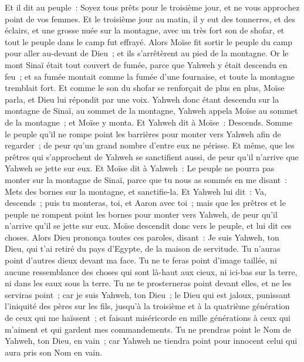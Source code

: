 \begin{multicols}{2}
Et il dit au peuple~: Soyez tous prêts pour le troisième jour, et ne vous approchez point de vos femmes.
Et le troisième jour au matin, il y eut des tonnerres, et des éclairs, et une grosse nuée sur la montagne, avec un très fort son de shofar, et tout le peuple dans le camp fut effrayé.
Alors Moïse fit sortir le peuple du camp pour aller au-devant de Dieu~; et ils s'arrêtèrent au pied de la montagne.
Or le mont Sinaï était tout couvert de fumée, parce que Yahweh y était descendu en feu~; et sa fumée montait comme la fumée d'une fournaise, et toute la montagne tremblait fort.
Et comme le son du shofar se renforçait de plus en plus, Moïse parla, et Dieu lui répondit par une voix.
Yahweh donc étant descendu sur la montagne de Sinaï, au sommet de la montagne, Yahweh appela Moïse au sommet de la montagne~; et Moïse y monta.
Et Yahweh dit à Moïse~: Descends. Somme le peuple qu'il ne rompe point les barrières pour monter vers Yahweh afin de regarder~; de peur qu'un grand nombre d'entre eux ne périsse.
Et même, que les prêtres qui s'approchent de Yahweh se sanctifient aussi, de peur qu'il n'arrive que Yahweh se jette sur eux.
 Et Moïse dit à Yahweh~: Le peuple ne pourra pas monter sur la montagne de Sinaï, parce que tu nous as sommés en me disant~: Mets des bornes sur la montagne, et sanctifie-la.
Et Yahweh lui dit~: Va, descends~; puis tu monteras, toi, et Aaron avec toi~; mais que les prêtres et le peuple ne rompent point les bornes pour monter vers Yahweh, de peur qu'il n'arrive qu'il se jette sur eux.
Moïse descendit donc vers le peuple, et lui dit ces choses.
\VerseOne{}Alors Dieu prononça toutes ces paroles, disant~:
Je suis Yahweh, ton Dieu, qui t'ai retiré du pays d'Egypte, de la maison de servitude.
Tu n'auras point d'autres dieux devant ma face.
Tu ne te feras point d'image taillée, ni aucune ressemblance des choses qui sont là-haut aux cieux, ni ici-bas sur la terre, ni dans les eaux sous la terre.
Tu ne te prosterneras point devant elles, et ne les serviras point~; car je suis Yahweh, ton Dieu~; le Dieu qui est jaloux, punissant l'iniquité des pères sur les fils, jusqu'à la troisième et à la quatrième génération de ceux qui me haïssent~;
et faisant miséricorde en mille générations à ceux qui m'aiment et qui gardent mes commandements.
Tu ne prendras point le Nom de Yahweh, ton Dieu, en vain~; car Yahweh ne tiendra point pour innocent celui qui aura pris son Nom en vain.

\end{multicols}
